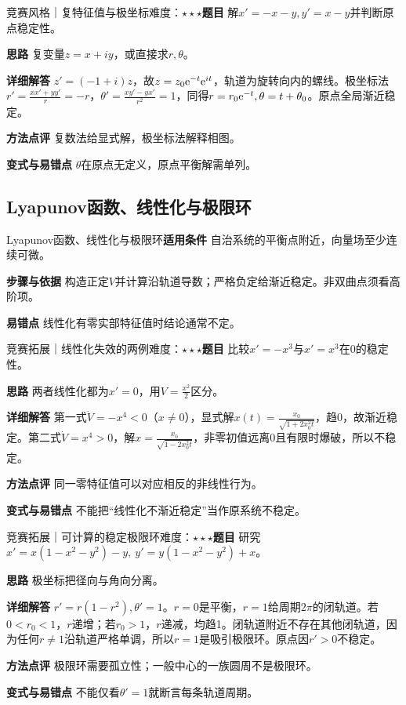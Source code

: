 \begin{example}{竞赛风格｜复特征值与极坐标}{难度：$\star\star\star$}\label{deep:ex:ode_qualitative_deep:rotation}\textbf{题目} 解$x'=-x-y,y'=x-y$并判断原点稳定性。\par\textbf{思路} 复变量$z=x+iy$，或直接求$r,\theta$。\par\textbf{详细解答} $z'=(-1+i)z$，故$z=z_0\mathrm{e}^{-t}\mathrm{e}^{it}$，轨道为旋转向内的螺线。极坐标法$r'=\frac{xx'+yy'}{r}=-r$，$\theta'=\frac{xy'-yx'}{r^2}=1$，同得$r=r_0\mathrm{e}^{-t},\theta=t+\theta_0$。原点全局渐近稳定。\par\textbf{方法点评} 复数法给显式解，极坐标法解释相图。\par\textbf{变式与易错点} $\theta$在原点无定义，原点平衡解需单列。\end{example}

\subsection{Lyapunov函数、线性化与极限环}\label{deep:ode_qualitative_deep:stability}

\begin{method}{Lyapunov函数、线性化与极限环}\textbf{适用条件} 自治系统的平衡点附近，向量场至少连续可微。\par\textbf{步骤与依据} 构造正定$V$并计算沿轨道导数；严格负定给渐近稳定。非双曲点须看高阶项。\par\textbf{易错点} 线性化有零实部特征值时结论通常不定。\end{method}

\begin{example}{竞赛拓展｜线性化失效的两例}{难度：$\star\star\star$}\label{deep:ex:ode_qualitative_deep:nonhyperbolic}\textbf{题目} 比较$x'=-x^3$与$x'=x^3$在0的稳定性。\par\textbf{思路} 两者线性化都为$x'=0$，用$V=\frac{x^2}{2}$区分。\par\textbf{详细解答} 第一式$\dot V=-x^4<0$（$x\ne0$），显式解$x(t)=\frac{x_0}{\sqrt{1+2x_0^2t}}$，趋0，故渐近稳定。第二式$\dot V=x^4>0$，解$x=\frac{x_0}{\sqrt{1-2x_0^2t}}$，非零初值远离0且有限时爆破，所以不稳定。\par\textbf{方法点评} 同一零特征值可以对应相反的非线性行为。\par\textbf{变式与易错点} 不能把“线性化不渐近稳定”当作原系统不稳定。\end{example}

\begin{example}{竞赛拓展｜可计算的稳定极限环}{难度：$\star\star\star$}\label{deep:ex:ode_qualitative_deep:limitcycle}\textbf{题目} 研究$x'=x(1-x^2-y^2)-y,\ y'=y(1-x^2-y^2)+x$。\par\textbf{思路} 极坐标把径向与角向分离。\par\textbf{详细解答} $r'=r(1-r^2),\theta'=1$。$r=0$是平衡，$r=1$给周期$2\pi$的闭轨道。若$0<r_0<1$，$r$递增；若$r_0>1$，$r$递减，均趋1。闭轨道附近不存在其他闭轨道，因为任何$r\ne1$沿轨道严格单调，所以$r=1$是吸引极限环。原点因$r'>0$不稳定。\par\textbf{方法点评} 极限环需要孤立性；一般中心的一族圆周不是极限环。\par\textbf{变式与易错点} 不能仅看$\theta'=1$就断言每条轨道周期。\end{example}


